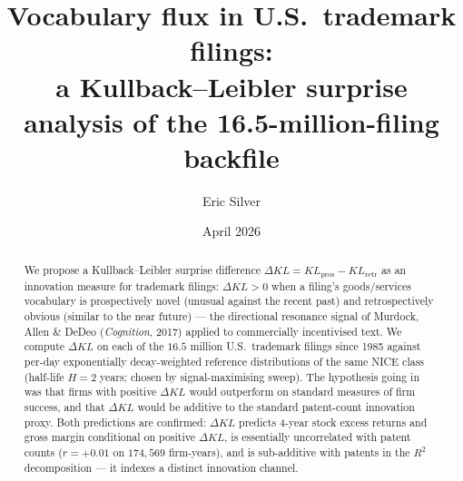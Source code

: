 \documentclass[11pt]{article}
\title{Vocabulary flux in U.S.\ trademark filings:\\
       a Kullback--Leibler surprise analysis of the 16.5-million-filing backfile}
\author{Eric Silver}
\affil{}
\date{April 2026}
\begin{document}
\maketitle

\begin{abstract}
We propose a Kullback--Leibler surprise difference $\Delta KL =
KL_{\text{pros}} - KL_{\text{retr}}$ as an innovation measure for
trademark filings: $\Delta KL > 0$ when a filing's goods/services
vocabulary is prospectively novel (unusual against the recent past)
and retrospectively obvious (similar to the near future) --- the
directional resonance signal of Murdock, Allen \& DeDeo
(\emph{Cognition}, 2017) applied to commercially incentivised text.
We compute $\Delta KL$ on each of the $16.5$ million U.S.\ trademark
filings since 1985 against per-day exponentially decay-weighted
reference distributions of the same NICE class (half-life $H = 2$
years; chosen by signal-maximising sweep). The hypothesis going in
was that firms with positive $\Delta KL$ would outperform on
standard measures of firm success, and that $\Delta KL$ would be
additive to the standard patent-count innovation proxy. Both
predictions are confirmed: $\Delta KL$ predicts 4-year stock
excess returns and gross margin conditional on positive $\Delta KL$,
is essentially uncorrelated with patent counts ($r = +0.01$ on
$174{,}569$ firm-years), and is sub-additive with patents in the
$R^2$ decomposition --- it indexes a distinct innovation channel.


\end{abstract}
\end{document}
